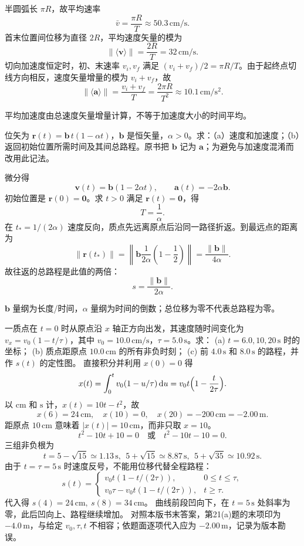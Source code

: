 \exsolution
半圆弧长 $\pi R$，故平均速率
\[
\boxed{\bar v=\frac{\pi R}{T}\approx50.3\,\mathrm{cm/s}.}
\]
首末位置间位移为直径 $2R$，平均速度矢量的模为
\[
\boxed{\lVert\langle\bm v\rangle\rVert=\frac{2R}{T}=32\,\mathrm{cm/s}.}
\]
切向加速度恒定时，初、末速率 $v_i,v_f$ 满足 $(v_i+v_f)/2=\pi R/T$。由于起终点切线方向相反，速度矢量增量的模为 $v_i+v_f$，故
\[
\boxed{\lVert\langle\bm a\rangle\rVert
=\frac{v_i+v_f}{T}
=\frac{2\pi R}{T^2}\approx10.1\,\mathrm{cm/s^2}.}
\]

\excheck
平均加速度由总速度矢量增量计算，不等于加速度大小的时间平均。


位矢为 $\bm r(t)=\bm b\,t(1-\alpha t)$，$\bm b$ 是恒矢量，$\alpha>0$。求：（a）速度和加速度；（b）返回初始位置所需时间及其间总路程。原书把 $\bm b$ 记为 $\bm a$；为避免与加速度混淆而改用此记法。

\exsolution
微分得
\[
\boxed{\bm v(t)=\bm b(1-2\alpha t),\qquad
\bm a(t)=-2\alpha\bm b.}
\]
初始位置是 $\bm r(0)=\bm0$。求 $t>0$ 满足 $\bm r(t)=\bm0$，得
\[
\boxed{T=\frac1\alpha.}
\]
在 $t_*=1/(2\alpha)$ 速度反向，质点先远离原点后沿同一路径折返。到最远点的距离为
\[
\lVert\bm r(t_*)\rVert
=\left\lVert\bm b\frac1{2\alpha}
\left(1-\frac12\right)\right\rVert
=\frac{\lVert\bm b\rVert}{4\alpha}.
\]
故往返的总路程是此值的两倍：
\[
\boxed{s=\frac{\lVert\bm b\rVert}{2\alpha}.}
\]

\excheck
$\bm b$ 量纲为长度/时间，$\alpha$ 量纲为时间的倒数；总位移为零不代表总路程为零。


一质点在 $t=0$ 时从原点沿 $x$ 轴正方向出发，其速度随时间变化为
$v_x=v_0(1-t/\tau)$，其中 $v_0=10.0\,\mathrm{cm/s}$，$\tau=5.0\,\mathrm s$。求：
(a) $t=6.0,10,20\,\mathrm s$ 时的坐标；
(b) 质点距原点 $10.0\,\mathrm{cm}$ 的所有非负时刻；
(c) 前 $4.0\,\mathrm s$ 和 $8.0\,\mathrm s$ 的路程，并作 $s(t)$ 的定性图。
\exsolution
直接积分并利用 $x(0)=0$ 得
\[
 x(t)=\int_0^t v_0(1-u/\tau)\,\mathrm du
 =v_0t\Bigl(1-\frac{t}{2\tau}\Bigr).
\]
以 $\mathrm{cm}$ 和 $\mathrm s$ 计，$x(t)=10t-t^2$，故
\[
 \boxed{x(6)=24\,\mathrm{cm},\quad x(10)=0,\quad
 x(20)=-200\,\mathrm{cm}=-2.00\,\mathrm m.}
\]
距原点 $10\,\mathrm{cm}$ 意味着 $|x(t)|=10\,\mathrm{cm}$，而非只取 $x=10$。
\[
 t^2-10t+10=0\quad\text{或}\quad t^2-10t-10=0.
\]
三组非负根为
\[
 \boxed{t=5-\sqrt{15}\simeq1.13\,\mathrm s,\ \
 5+\sqrt{15}\simeq8.87\,\mathrm s,\ \
 5+\sqrt{35}\simeq10.92\,\mathrm s.}
\]
由于 $t=\tau=5\,\mathrm s$ 时速度反号，不能用位移代替全程路程：
\[
 s(t)=\begin{cases}
 v_0t(1-t/(2\tau)),&0\le t\le\tau,\\
 v_0\tau-v_0t(1-t/(2\tau)),&t\ge\tau .
 \end{cases}
\]
代入得 $\boxed{s(4)=24\,\mathrm{cm},\ s(8)=34\,\mathrm{cm}}$。
曲线前段凹向下，在 $t=5\,\mathrm s$ 处斜率为零，此后凹向上、路程继续增加。
\excheck 对照本版书末答案，第21(a)题的末项印为 $-4.0\,\mathrm m$，与给定
$v_0,\tau,t$ 不相容；依题面逐项代入应为 $-2.00\,\mathrm m$，记录为版本勘误。

